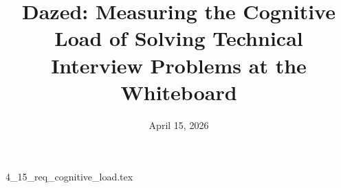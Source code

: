 \documentclass{article}      %
\title{Dazed: Measuring the Cognitive Load of Solving Technical Interview Problems at the Whiteboard}  %
\date{April 15, 2026}
\begin{document}

\maketitle                   %



{4_15_req_cognitive_load.tex}
\printbibliography
\end{document}
